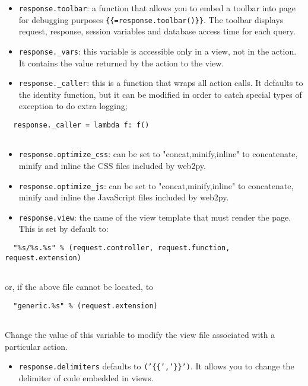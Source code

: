 \documentclass[justified,sixbynine,notoc]{tufte-book}
\def\ft{\small\tt}
\begin{document}
\begin{fullwidth}
\begin{itemize}
\item {\ft response.toolbar}: a function that allows you to embed a toolbar into page for debugging purposes {\ft \{\{=response.toolbar()\}\}}. The toolbar displays request, response, session variables and database access time for each query.

\item {\ft response.\_vars}: this variable is accessible only in a view, not in the action. It contains the value returned by the action to the view.

\item {\ft response.\_caller}: this is a function that wraps all action calls. It defaults to the identity function, but it can be modified in order to catch special types of exception to do extra logging;
\end{itemize}
\begin{lstlisting}
  response._caller = lambda f: f()
  
\end{lstlisting}
\begin{itemize}
\item {\ft response.optimize\_css}: can be set to "concat,minify,inline" to concatenate, minify and inline the CSS files included by web2py.

\item {\ft response.optimize\_js}: can be set to "concat,minify,inline" to concatenate, minify and inline the JavaScript files included by web2py.

\item {\ft response.view}: the name of the view template that must render the page. This is set by default to:
\end{itemize}
\begin{lstlisting}
  "%s/%s.%s" % (request.controller, request.function, request.extension)
  
\end{lstlisting}
or, if the above file cannot be located, to
\begin{lstlisting}
  "generic.%s" % (request.extension)
  
\end{lstlisting}
Change the value of this variable to modify the view file associated with a particular action.

\begin{itemize}
\item {\ft response.delimiters} defaults to {\ft ('\{\{','\}\}')}. It allows you to change the delimiter of code embedded in views.


\end{itemize}
\end{fullwidth}
\end{document}
